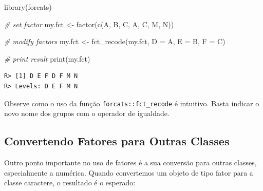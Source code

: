 \documentclass[
  11pt,
]{book}
\newenvironment{Shaded}{\begin{snugshade}}{\end{snugshade}}
\newcommand{\CommentTok}[1]{\textcolor[rgb]{0.37,0.37,0.37}{\textit{#1}}}
\newcommand{\FunctionTok}[1]{\textcolor[rgb]{0,0,0}{#1}}
\newcommand{\NormalTok}[1]{#1}
\newcommand{\OtherTok}[1]{\textcolor[rgb]{0.37,0.37,0.37}{#1}}
\newcommand{\StringTok}[1]{\textcolor[rgb]{0.5,0.5,0.5}{#1}}
\begin{document}
\begin{Shaded}
\begin{Highlighting}[]
\FunctionTok{library}\NormalTok{(forcats)}

\CommentTok{\# set factor}
\NormalTok{my.fct }\OtherTok{\textless{}{-}} \FunctionTok{factor}\NormalTok{(}\FunctionTok{c}\NormalTok{(}\StringTok{\textquotesingle{}A\textquotesingle{}}\NormalTok{, }\StringTok{\textquotesingle{}B\textquotesingle{}}\NormalTok{, }\StringTok{\textquotesingle{}C\textquotesingle{}}\NormalTok{, }\StringTok{\textquotesingle{}A\textquotesingle{}}\NormalTok{, }\StringTok{\textquotesingle{}C\textquotesingle{}}\NormalTok{, }\StringTok{\textquotesingle{}M\textquotesingle{}}\NormalTok{, }\StringTok{\textquotesingle{}N\textquotesingle{}}\NormalTok{))}

\CommentTok{\# modify factors}
\NormalTok{my.fct }\OtherTok{\textless{}{-}} \FunctionTok{fct\_recode}\NormalTok{(my.fct,}
                     \StringTok{\textquotesingle{}D\textquotesingle{}} \OtherTok{=} \StringTok{\textquotesingle{}A\textquotesingle{}}\NormalTok{,}
                     \StringTok{\textquotesingle{}E\textquotesingle{}} \OtherTok{=} \StringTok{\textquotesingle{}B\textquotesingle{}}\NormalTok{,}
                     \StringTok{\textquotesingle{}F\textquotesingle{}} \OtherTok{=} \StringTok{\textquotesingle{}C\textquotesingle{}}\NormalTok{)}

\CommentTok{\# print result}
\FunctionTok{print}\NormalTok{(my.fct)}
\end{Highlighting}
\end{Shaded}

\begin{verbatim}
R> [1] D E F D F M N
R> Levels: D E F M N
\end{verbatim}

Observe como o uso da função \texttt{forcats::fct\_recode} é intuitivo. Basta indicar o novo nome dos grupos com o operador de igualdade.

\hypertarget{convertendo-fatores-para-outras-classes}{%
\subsection{Convertendo Fatores para Outras Classes}\label{convertendo-fatores-para-outras-classes}}

Outro ponto importante no uso de fatores é a sua conversão para outras classes, especialmente a numérica. Quando convertemos um objeto de tipo fator para a classe caractere, o resultado é o esperado:
\end{document}
